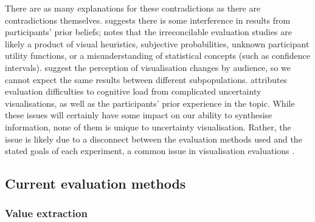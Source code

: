 \documentclass[]{ar-1col-S2O}
\begin{document}
There are as many explanations for these contradictions as there are
contradictions themselves. \citet{Kim2019} suggests there is some
interference in results from participants' prior beliefs;
\citet{Hullman2016} notes that the irreconcilable evaluation studies are
likely a product of visual heuristics, subjective probabilities, unknown
participant utility functions, or a misunderstanding of statistical
concepts (such as confidence intervals). \citet{Kinkeldey2014} suggest
the perception of visualisation changes by audience, so we cannot expect
the same results between different subpopulations. \citet{Brennen2018}
attributes evaluation difficulties to cognitive load from complicated
uncertainty visualisations, as well as the participants' prior
experience in the topic. While these issues will certainly have some
impact on our ability to synthesise information, none of them is unique
to uncertainty visualisation. Rather, the issue is likely due to a
disconnect between the evaluation methods used and the stated goals of
each experiment, a common issue in visualisation evaluations
\citep{Vanderplas2020}.

\subsection{Current evaluation
methods}\label{current-evaluation-methods}

\subsubsection{Value extraction}\label{value-extraction}
\end{document}
